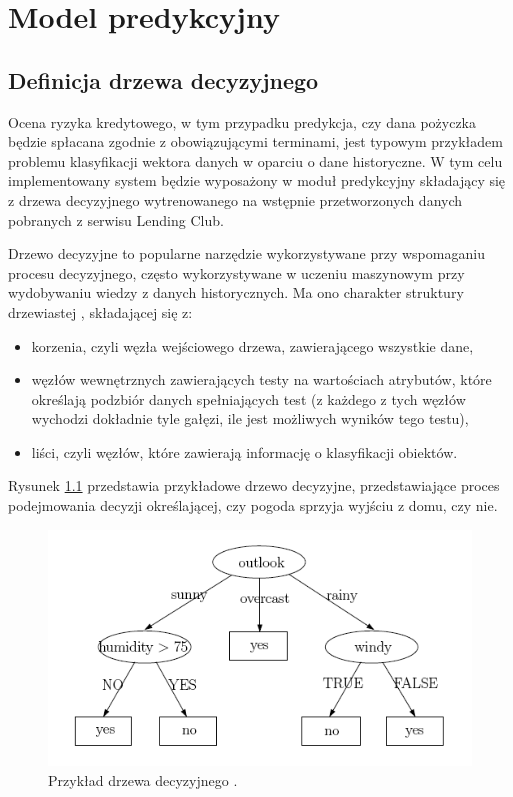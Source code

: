\chapter{Model predykcyjny}

\section{Definicja drzewa decyzyjnego}

Ocena ryzyka kredytowego, w tym przypadku predykcja, czy dana pożyczka będzie spłacana zgodnie z obowiązującymi terminami, jest typowym przykładem problemu klasyfikacji wektora danych w oparciu o dane historyczne. W tym celu implementowany system będzie wyposażony w moduł predykcyjny składający się z drzewa decyzyjnego wytrenowanego na wstępnie przetworzonych danych pobranych z serwisu Lending Club.

Drzewo decyzyjne to popularne narzędzie wykorzystywane przy wspomaganiu procesu decyzyjnego, często wykorzystywane w uczeniu maszynowym przy wydobywaniu wiedzy z danych historycznych. Ma ono charakter struktury drzewiastej \cite{MED}, składającej się z:

\begin{itemize}
	\item korzenia, czyli węzła wejściowego drzewa, zawierającego wszystkie dane,
	\item węzłów wewnętrznych zawierających testy na wartościach atrybutów, które określają podzbiór danych spełniających test (z każdego z tych węzłów wychodzi dokładnie tyle gałęzi, ile jest możliwych wyników tego testu),
	\item liści, czyli węzłów, które zawierają informację o klasyfikacji obiektów.
\end{itemize}
Rysunek \ref{tree:example} przedstawia przykładowe drzewo decyzyjne, przedstawiające proces podejmowania decyzji określającej, czy pogoda sprzyja wyjściu z domu, czy nie.

\begin{figure}[H] \centering %
	\includegraphics[scale=0.5]{img/decision_tree_example.png}
	\caption{Przykład drzewa decyzyjnego \cite{MED}.}
	\label{tree:example}
\end{figure}

